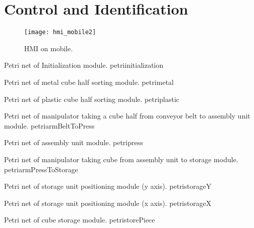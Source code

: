 
\chapter{Control and Identification}
\label{chap:controlAndIdent}

\begin{figure}[H]
  \centering
 \texttt{[image: hmi\_mobile2]}
  \caption{HMI on mobile.}
  \label{fig:hmi_mobile}
\end{figure}



{Petri net of Initialization module.}
{petriinitialization}
\newpage


\newpage
{}
{Petri net of metal cube half sorting module.}
{petrimetal}
\newpage


\newpage
{}
{Petri net of plastic cube half sorting module.}
{petriplastic}
\newpage


\newpage
{}
{Petri net of manipulator taking a cube half from conveyor belt to assembly unit
  module.}
{petriarmBeltToPress}
\newpage


\clearpage
\pagebreak
{}
{Petri net of assembly unit module.}
{petripress}
\newpage


\newpage
{}
{Petri net of manipulator taking cube from assembly unit to storage module.}
{petriarmPressToStorage}
\newpage


\newpage
{}
{Petri net of storage unit positioning module (y axis).}
{petristorageY}
\newpage


\newpage
{}
{Petri net of storage unit positioning module (x axis).}
{petristorageX}
\newpage


\newpage
{}
{Petri net of cube storage module.}
{petristorePiece}
\newpage

